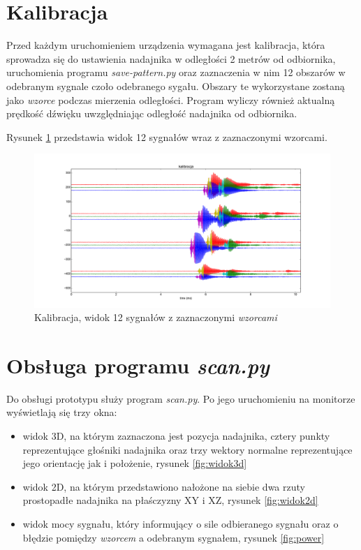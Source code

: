 \section{Kalibracja}

Przed każdym uruchomieniem urządzenia wymagana jest kalibracja,
która sprowadza się do ustawienia nadajnika w odległości 2 metrów od odbiornika,
uruchomienia programu \textit{save-pattern.py} oraz zaznaczenia w nim 12 obszarów w odebranym sygnale czoło odebranego sygału.
Obszary te wykorzystane zostaną jako \textit{wzorce} podczas mierzenia odległości.
Program wyliczy również aktualną prędkość dźwięku uwzględniając odległość nadajnika od odbiornika.

Rysunek \ref{fig:kalibracja_12x} przedstawia widok 12 sygnałów wraz z zaznaczonymi wzorcami.


 \begin{figure}[h!]
    \centering
    \includegraphics[width=1.12\textwidth, trim= 46mm 0mm 0mm 0mm,clip]{kalibracja_12x}
    \caption{Kalibracja, widok 12 sygnałów z zaznaczonymi \textit{wzorcami}}
    \label{fig:kalibracja_12x}
\end{figure}

\newpage

\section{Obsługa programu \textit{scan.py}}

Do obsługi prototypu służy program \textit{scan.py}. Po jego uruchomieniu 
na monitorze wyświetlają się trzy okna: 
\begin{itemize}
 \item widok 3D, na którym zaznaczona jest 
pozycja nadajnika, cztery punkty reprezentujące głośniki nadajnika oraz trzy wektory normalne reprezentujące 
jego orientację jak i położenie, rysunek \ref{fig:widok3d}
 \item widok 2D, na którym przedstawiono nałożone na siebie dwa rzuty prostopadłe nadajnika na płaśczyzny XY i XZ, rysunek \ref{fig:widok2d}
 \item widok mocy sygnału, który informujący o sile odbieranego sygnału oraz o błędzie pomiędzy \textit{wzorcem} a odebranym sygnałem, rysunek \ref{fig:power}
\end{itemize}

